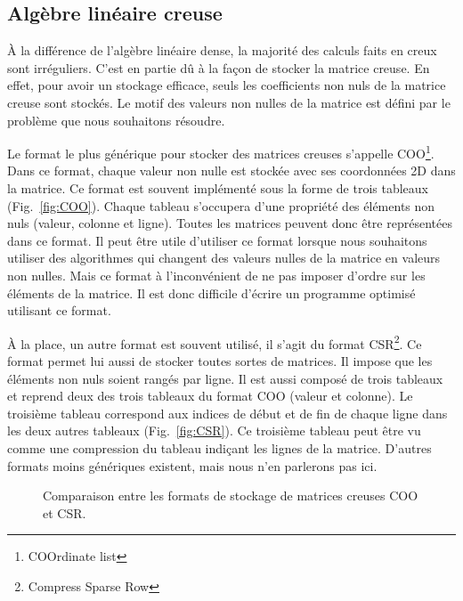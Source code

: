 \subsection{Algèbre linéaire creuse}
\`{A} la différence de l'algèbre linéaire dense, la majorité des calculs faits en creux sont irréguliers.
%
C'est en partie dû à la façon de stocker la matrice creuse.
%
En effet, pour avoir un stockage efficace, seuls les coefficients non nuls de la matrice creuse sont stockés.
%
Le motif des valeurs non nulles de la matrice est défini par le problème que nous souhaitons résoudre.


Le format le plus générique pour stocker des matrices creuses s'appelle COO\footnote{COOrdinate list}.
%
Dans ce format, chaque valeur non nulle est stockée avec ses coordonnées 2D dans la matrice.
%
Ce format est souvent implémenté sous la forme de trois tableaux (Fig.~\ref{fig:COO}).
%
Chaque tableau s'occupera d'une propriété des éléments non nuls (valeur, colonne et ligne).
%
Toutes les matrices peuvent donc être représentées dans ce format.
%
Il peut être utile d'utiliser ce format lorsque nous souhaitons utiliser des algorithmes qui changent des valeurs nulles de la matrice en valeurs non nulles.
%
Mais ce format à l'inconvénient de ne pas imposer d'ordre sur les éléments de la matrice.
%
Il est donc difficile d'écrire un programme optimisé utilisant ce format.


\`A la place, un autre format est souvent utilisé, il s'agit du format CSR\footnote{Compress Sparse Row}.
%
Ce format permet lui aussi de stocker toutes sortes de matrices.
%
Il impose que les éléments non nuls soient rangés par ligne.
%
Il est aussi composé de trois tableaux et reprend deux des trois tableaux du format COO (valeur et colonne).
%
Le troisième tableau correspond aux indices de début et de fin de chaque ligne dans les deux autres tableaux (Fig.~\ref{fig:CSR}).
%
Ce troisième tableau peut être vu comme une compression du tableau indiçant les lignes de la matrice.
%
D'autres formats moins génériques existent, mais nous n'en parlerons pas ici.

\begin{figure}[!h]
     \begin{center}
    \end{center}
    \caption{Comparaison entre les formats de stockage de matrices creuses COO et CSR.}
    \label{fig:matrix_storage}
\end{figure}


